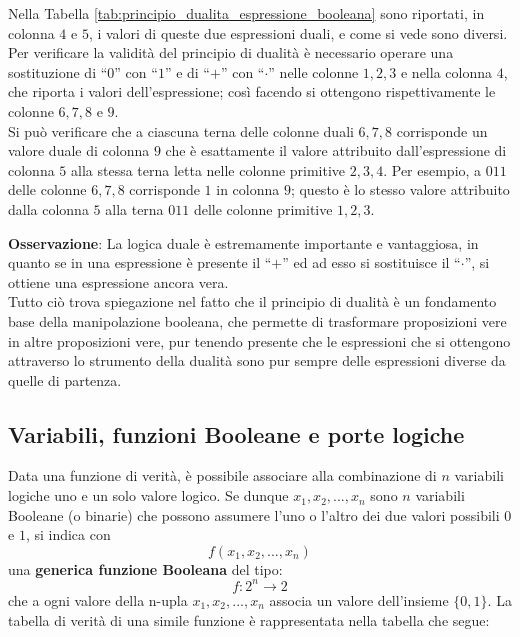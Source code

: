 \documentclass[a4paper]{extarticle}
\newcommand{\quotes}[1]{``#1''}
\begin{document}
\noindent
Nella Tabella \ref{tab:principio_dualita_espressione_booleana} sono riportati, in colonna \(4\) e \(5\), i valori di queste due espressioni duali, e come si vede sono diversi. Per verificare la validità del principio di dualità è necessario operare una sostituzione di \quotes{\(0\)} con \quotes{\(1\)} e di \quotes{\(+\)} con \quotes{\(\cdot\)} nelle colonne \(1, 2, 3\) e nella colonna \(4\), che riporta i valori dell’espressione; così facendo si ottengono rispettivamente le colonne \(6, 7, 8\) e \(9\).\\
Si può verificare che a ciascuna terna delle colonne duali \(6, 7, 8\) corrisponde un valore duale di colonna \(9\) che è esattamente il valore attribuito dall’espressione di colonna \(5\) alla stessa terna letta nelle colonne primitive \(2, 3, 4\). Per esempio, a \(011\) delle colonne \(6, 7, 8\) corrisponde \(1\) in colonna \(9\); questo è lo stesso valore attribuito dalla colonna \(5\) alla terna \(011\) delle colonne primitive \(1, 2, 3\).

\vspace{1em}
\noindent
\textbf{Osservazione}: La logica duale è estremamente importante e vantaggiosa, in quanto se in una espressione è presente il \quotes{\(+\)} ed ad esso si sostituisce il \quotes{\(\cdot\)}, si ottiene una espressione ancora vera.\\
Tutto ciò trova spiegazione nel fatto che il principio di dualità è un fondamento base della manipolazione booleana, che permette di trasformare proposizioni vere in altre proposizioni vere, pur tenendo presente che le espressioni che si ottengono attraverso lo strumento della dualità sono pur sempre delle espressioni diverse da quelle di partenza.

\subsection{Variabili, funzioni Booleane e porte logiche}
Data una funzione di verità, è possibile associare alla combinazione di \(n\) variabili logiche uno e un solo valore logico. Se dunque \(x_1, x_2, ..., x_n\) sono \(n\) variabili Booleane (o binarie) che possono assumere l’uno o l’altro dei due valori possibili \(0\) e \(1\), si indica con
\[f(x_1, x_2, ..., x_n)\]
una \textbf{generica funzione Booleana} del tipo:
\[f : 2^n \rightarrow 2\]
che a ogni valore della n-upla \(x_1, x_2, ..., x_n\) associa un valore dell’insieme \(\{0, 1\}\). La tabella di verità di una simile funzione è rappresentata nella tabella che segue:
\end{document}
